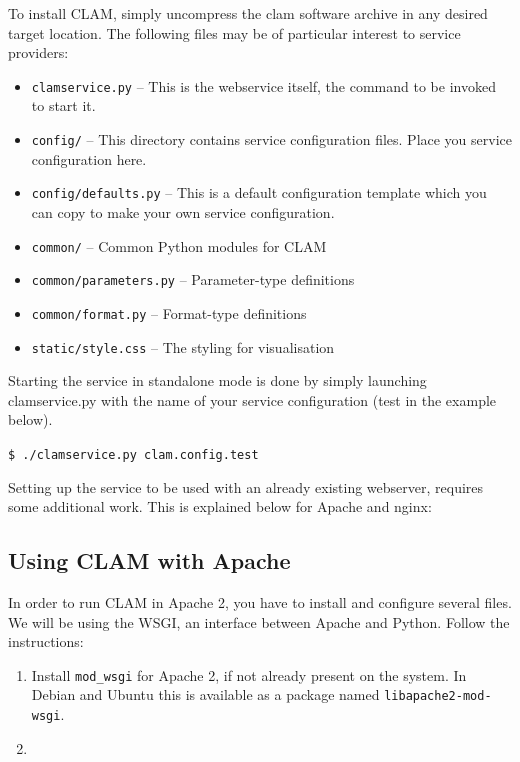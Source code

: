 \documentclass[a4paper,12pt]{report}
\begin{document}
To install CLAM, simply uncompress the clam software archive in any desired target location. The following files may be of particular interest to service providers:

\begin{itemize}
\item \texttt{clamservice.py} -- This is the webservice itself, the command to be invoked to start it.
\item \texttt{config/} -- This directory contains service configuration files. Place you service configuration here.
\item \texttt{config/defaults.py} -- This is a default configuration template which you can copy to make your own service configuration.
\item \texttt{common/} -- Common Python modules for CLAM
\item \texttt{common/parameters.py} -- Parameter-type definitions
\item \texttt{common/format.py} -- Format-type definitions
\item \texttt{static/style.css} -- The styling for visualisation

\end{itemize}

Starting the service in standalone mode is done by simply launching clamservice.py with the name of your service configuration (test in the example below).

\texttt{\$ ./clamservice.py clam.config.test}


Setting up the service to be used with an already existing webserver, requires some additional work. This is explained below for Apache and nginx:

\subsection{Using CLAM with Apache}

In order to run CLAM in Apache 2, you have to install and configure several files. We will be using the WSGI, an interface between Apache and Python. Follow the instructions:

\begin{enumerate}
\item Install \texttt{mod_wsgi} for Apache 2, if not already present on the system. In Debian and Ubuntu this is available as a package named \texttt{libapache2-mod-wsgi}.
\item 
\end{enumerate}
\end{document}
